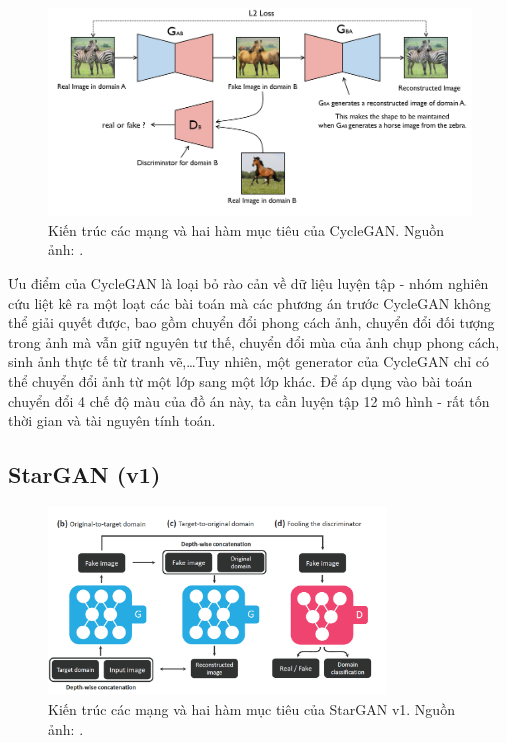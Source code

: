 \documentclass[12pt]{extreport}
\begin{document}
\begin{figure}[H]
    \centering
    \includegraphics[width=\textwidth]{figure16}
    \caption{Kiến trúc các mạng và hai hàm mục tiêu của CycleGAN. Nguồn ảnh: \cite{mnistsvhntransfer}.}
\end{figure}

Ưu điểm của CycleGAN là loại bỏ rào cản về dữ liệu luyện tập - nhóm nghiên cứu liệt kê ra một loạt các bài toán mà các phương án trước CycleGAN không thể giải quyết được, bao gồm chuyển đổi phong cách ảnh, chuyển đổi đối tượng trong ảnh mà vẫn giữ nguyên tư thế, chuyển đổi mùa của ảnh chụp phong cách, sinh ảnh thực tế từ tranh vẽ,\dots Tuy nhiên, một generator của CycleGAN chỉ có thể chuyển đổi ảnh từ một lớp sang một lớp khác. Để áp dụng vào bài toán chuyển đổi 4 chế độ màu của đồ án này, ta cần luyện tập 12 mô hình - rất tốn thời gian và tài nguyên tính toán.

\subsection{StarGAN (v1)}

\begin{figure}[H]
    \centering
    \includegraphics[width=0.8\textwidth]{figure17}
    \caption{Kiến trúc các mạng và hai hàm mục tiêu của StarGAN v1. Nguồn ảnh: \cite{DBLP:journals/corr/abs-1711-09020}.}
\end{figure}
\end{document}
